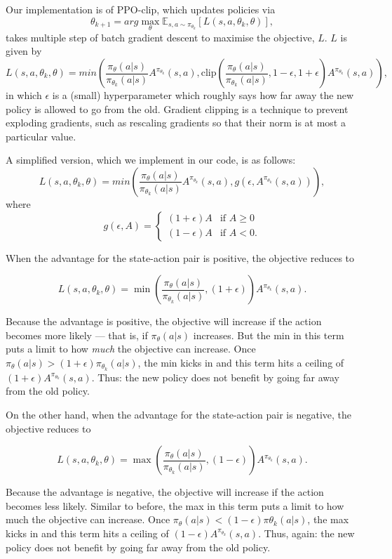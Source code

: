 \documentclass[12pt,a4paper]{article}
\begin{document}
Our implementation is of PPO-clip, which updates policies via $$\theta_{k+1} = arg \max_\theta \mathbb{E}_{s,a \sim \pi_{\theta_k}} \left[ L(s,a,\theta_k,\theta) \right],$$ takes multiple step of batch gradient descent to maximise the objective, $L$. $L$ is given by $$L(s,a,\theta_k,\theta) = min \left(\frac{\pi_\theta(a|s)}{\pi_{\theta_k}(a|s)} A^{\pi_{\theta_k}}(s,a), \text{clip} \left( \frac{\pi_\theta(a|s)}{\pi_{\theta_k}(a|s)}, 1 - \epsilon, 1 + \epsilon \right) A^{\pi_{\theta_k}}(s,a) \right),$$ in which $\epsilon$ is a (small) hyperparameter which roughly says how far away the new policy is allowed to go from the old. Gradient clipping is a technique to prevent exploding gradients, such as rescaling gradients so that their norm is at most a particular value. 

A simplified version, which we implement in our code, is as follows: $$L(s,a,\theta_k,\theta) = min \left( \frac{\pi_\theta(a|s)}{\pi_{\theta_k}(a|s)} A^{\pi_{\theta_k}}(s,a), g(\epsilon, A^{\pi_{\theta_k}}(s,a)) \right),$$ where $$g(\epsilon, A) = \begin{cases} (1+\epsilon)A & \mbox{if } A \geq 0 \\ (1-\epsilon)A & \mbox{if } A < 0. \end{cases}$$

When the advantage for the state-action pair is positive, the objective reduces to

\[L(s,a,\theta_k,\theta) = \min\left(
\frac{\pi_{\theta}(a|s)}{\pi_{\theta_k}(a|s)}, (1 + \epsilon)
\right)  A^{\pi_{\theta_k}}(s,a).\]

Because the advantage is positive, the objective will increase if the
action becomes more likely --- that is, if \(\pi_{\theta}(a|s)\)
increases. But the min in this term puts a limit to how \emph{much} the
objective can increase. Once
\(\pi_{\theta}(a|s) > (1+\epsilon) \pi_{\theta_k}(a|s)\), the min kicks
in and this term hits a ceiling of
\((1+\epsilon) A^{\pi_{\theta_k}}(s,a)\). Thus: the new policy
does not benefit by going far away from the old policy.

On the other hand, when the advantage for the state-action pair is negative, the objective reduces to

\[L(s,a,\theta_k,\theta) = \max\left(
\frac{\pi_{\theta}(a|s)}{\pi_{\theta_k}(a|s)}, (1 - \epsilon)
\right)  A^{\pi_{\theta_k}}(s,a).\]

Because the advantage is negative, the objective will increase if the
action becomes less likely. Similar to before, the max in this term puts a limit to how much the objective can increase. Once \(\pi_{\theta}(a|s) < (1-\epsilon) \pi{\theta_k}(a|s)\), the max kicks in and this term hits a ceiling of \((1-\epsilon) A^{\pi_{\theta_k}}(s,a)\). Thus, again: the new policy does not benefit by going far away from the old policy.
\end{document}
